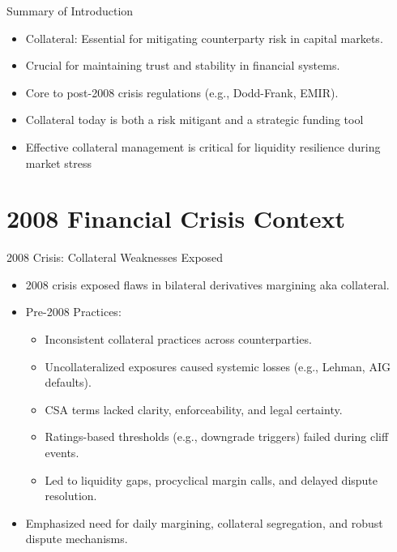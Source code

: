 \documentclass[handout, aspectratio=169]{beamer}
\begin{document}
\begin{frame}{Summary of Introduction}
  \begin{itemize}
    \item Collateral: Essential for mitigating counterparty risk in capital markets.
    \item Crucial for maintaining trust and stability in financial systems.
    \item Core to post-2008 crisis regulations (e.g., Dodd-Frank, EMIR).
    \item Collateral today is both a risk mitigant and a strategic funding tool
    \item Effective collateral management is critical for liquidity resilience during market stress    
  \end{itemize}
\end{frame}

\section{2008 Financial Crisis Context}
\begin{frame}{2008 Crisis: Collateral Weaknesses Exposed}
  \begin{itemize}
    \item 2008 crisis exposed flaws in bilateral derivatives margining aka collateral.
    \item Pre-2008 Practices:
    \begin{itemize} 
      \item Inconsistent collateral practices across counterparties.
      \item Uncollateralized exposures caused systemic losses (e.g., Lehman, AIG defaults).
      \item CSA terms lacked clarity, enforceability, and legal certainty.
      \item Ratings-based thresholds (e.g., downgrade triggers) failed during cliff events.
      \item Led to liquidity gaps, procyclical margin calls, and delayed dispute resolution.
    \end{itemize}
    \item Emphasized need for daily margining, collateral segregation, and robust dispute mechanisms.
  \end{itemize}
\end{frame}
\end{document}
